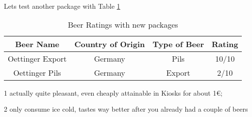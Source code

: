 \documentclass{article}
\begin{document}
\par
Lets test another package with Table \ref{table:2}
\begin{table}[h]
\begin{center}
\begin{threeparttable}
\begin{tabular}{c c c c}
    \toprule
    \textbf{Beer Name} & \textbf{Country of Origin} & \textbf{Type of Beer} & \textbf{Rating} \\ 
    \midrule
      Oettinger Export\tnote{1}   & Germany & Pils & 10/10 \\
      Oettinger Pils\tnote{2}   & Germany & Export & 2/10 \\ 
      \bottomrule
\end{tabular}
\begin{tablenotes}
\item[1] actually quite pleasant, even cheaply attainable in Kiosks for about 1€; \item[2] only consume ice cold, tastes way better after you already had a couple of beers
\end{tablenotes}
\end{threeparttable}
\end{center}
\caption{Beer Ratings with new packages}{}
\label{table:2}
\end{table}
\end{document}

